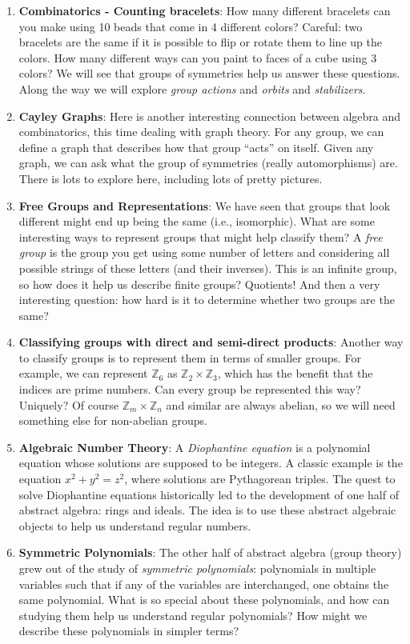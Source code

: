 \documentclass[10pt,letterpaper]{article}
\def\Z{\mathbb{Z}}
\begin{document}
\begin{enumerate}
  \item \textbf{Combinatorics - Counting bracelets}: How many different bracelets can you make using 10 beads that come in 4 different colors?  Careful: two bracelets are the same if it is possible to flip or rotate them to line up the colors.  How many different ways can you paint to faces of a cube using 3 colors?  We will see that groups of symmetries help us answer these questions. Along the way we will explore \emph{group actions} and \emph{orbits} and \emph{stabilizers}. 
  \item \textbf{Cayley Graphs}: Here is another interesting connection between algebra and combinatorics, this time dealing with graph theory.  For any group, we can define a graph that describes how that group ``acts'' on itself.  Given any graph, we can ask what the group of symmetries (really automorphisms) are.  There is lots to explore here, including lots of pretty pictures.
  \item \textbf{Free Groups and Representations}: We have seen that groups that look different might end up being the same (i.e., isomorphic).  What are some interesting ways to represent groups that might help classify them?  A \emph{free group} is the group you get using some number of letters and considering all possible strings of these letters (and their inverses).  This is an infinite group, so how does it help us describe finite groups?  Quotients!  And then a very interesting question: how hard is it to determine whether two groups are the same?
  \item \textbf{Classifying groups with direct and semi-direct products}: Another way to classify groups is to represent them in terms of smaller groups.  For example, we can represent $\Z_6$ as $\Z_2 \times \Z_3$, which has the benefit that the indices are prime numbers.  Can every group be represented this way?  Uniquely?  Of course $\Z_m \times \Z_n$ and similar are always abelian, so we will need something else for non-abelian groups.
  \item \textbf{Algebraic Number Theory}: A \emph{Diophantine equation} is a polynomial equation whose solutions are supposed to be integers.  A classic example is the equation $x^2 + y^2 = z^2$, where solutions are Pythagorean triples.  The quest to solve Diophantine equations historically led to the development of one half of abstract algebra: rings and ideals.  The idea is to use these abstract algebraic objects to help us understand regular numbers.
  \item \textbf{Symmetric Polynomials}: The other half of abstract algebra (group theory) grew out of the study of \emph{symmetric polynomials}: polynomials in multiple variables such that if any of the variables are interchanged, one obtains the same polynomial.  What is so special about these polynomials, and how can studying them help us understand regular polynomials?  How might we describe these polynomials in simpler terms?

\end{enumerate}
\end{document}

